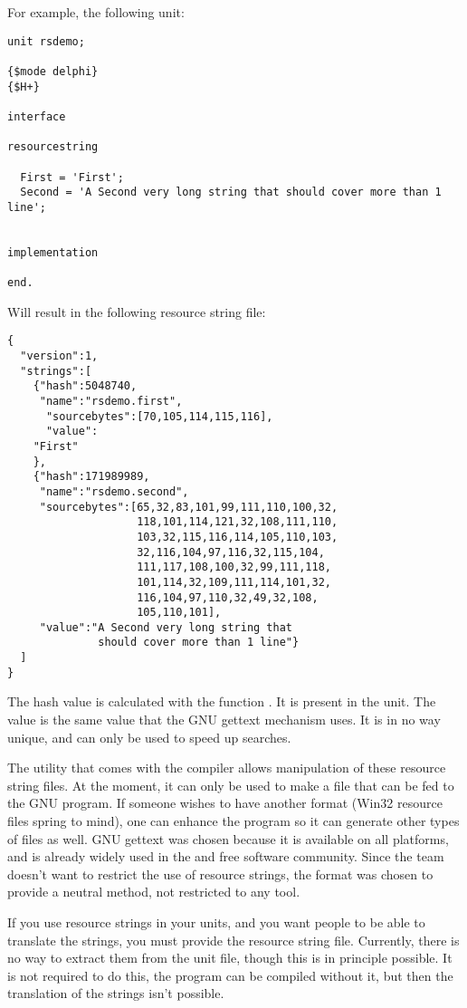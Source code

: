 For example, the following unit:
\begin{verbatim}
unit rsdemo;

{$mode delphi}
{$H+}

interface

resourcestring

  First = 'First';
  Second = 'A Second very long string that should cover more than 1 line';


implementation

end.
\end{verbatim}
Will result in the following resource string file:
\begin{verbatim}
{ 
  "version":1,
  "strings":[
    {"hash":5048740,
     "name":"rsdemo.first",
      "sourcebytes":[70,105,114,115,116],
      "value":
    "First"
    },
    {"hash":171989989,
     "name":"rsdemo.second",
     "sourcebytes":[65,32,83,101,99,111,110,100,32,
                    118,101,114,121,32,108,111,110,
                    103,32,115,116,114,105,110,103,
                    32,116,104,97,116,32,115,104,
                    111,117,108,100,32,99,111,118,
                    101,114,32,109,111,114,101,32,
                    116,104,97,110,32,49,32,108,
                    105,110,101],
     "value":"A Second very long string that 
              should cover more than 1 line"}
  ]
}
\end{verbatim}
The hash value is calculated with the function . It is present in
the  unit. The value is the same value that the GNU gettext
mechanism uses. It is in no way unique, and can only be used to speed up
searches.

The  utility that comes with the \fpc compiler allows 
manipulation of these resource string files. At the moment, it can only be used
to make a  file that can be fed to the GNU  program.
If someone wishes to have another format (Win32 resource files spring to
mind), one can enhance the  program so it can generate
other types of files as well. GNU gettext was chosen because it is available
on all platforms, and is already widely used in the  and free
software community. Since the \fpc team doesn't want to restrict the use
of resource strings, the  format was chosen to provide a neutral
method, not restricted to any tool.

If you use resource strings in your units, and you want people to be able to
translate the strings, you must provide the resource string file. Currently,
there is no way to extract them from the unit file, though this is in
principle possible. It is not required to do this, the program can be
compiled without it, but then the translation of the strings isn't possible.


